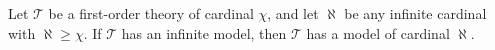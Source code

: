 Let $\mathcal{T}$ be a first-order theory of cardinal $\chi$, and let $\aleph$ be any infinite cardinal with $\aleph \geqslant \chi$. If $\mathcal{T}$ has an infinite model, then $\mathcal{T}$ has a model of cardinal $\aleph$.
